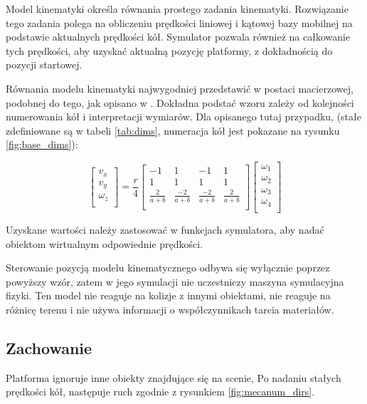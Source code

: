 	Model kinematyki określa równania prostego zadania kinematyki. 
	Rozwiązanie tego zadania polega na obliczeniu prędkości liniowej i kątowej bazy mobilnej na podstawie aktualnych prędkości kół.
	Symulator pozwala również na całkowanie tych prędkości, aby uzyskać aktualną pozycję platformy, z dokładnością do pozycji startowej.
	
	Równania modelu kinematyki najwygodniej przedstawić w postaci macierzowej, podobnej do tego, jak opisano w \cite{wheels}. 
	Dokładna podstać wzoru zależy od kolejności numerowania kół i interpretacji wymiarów.
	Dla opisanego tutaj przypadku, (stałe zdefiniowane są w tabeli \ref{tab:dims}, numeracja kół jest pokazane na rysunku \ref{fig:base_dims}):
	
	\begin{equation}
	\begin{bmatrix}
	v_x \\
	v_y \\
	\omega_z \\
	\end{bmatrix}
	=
	\frac{r}{4}
	\begin{bmatrix}
	-1 & 1 & -1 & 1 \\
	1 & 1 & 1 & 1 \\
	\frac{2}{a+b} & \frac{-2}{a+b} & \frac{-2}{a+b} & \frac{2}{a+b} \\
	\end{bmatrix}
	\begin{bmatrix}
	\omega_1 \\
	\omega_2 \\
	\omega_3 \\
	\omega_4 \\
	\end{bmatrix}
	\end{equation}
	
	Uzyskane wartości należy zastosować w funkcjach symulatora, aby nadać obiektom wirtualnym odpowiednie prędkości.
	
	Sterowanie pozycją modelu kinematycznego odbywa się wyłącznie poprzez powyższy wzór, zatem w jego symulacji nie uczestniczy maszyna symulacyjna fizyki.
	Ten model nie reaguje na kolizje z innymi obiektami, nie reaguje na różnicę terenu i nie używa informacji o współczynnikach tarcia materiałów.

	\subsection{Zachowanie}
		Platforma ignoruje inne obiekty znajdujące się na scenie,
		Po nadaniu stałych prędkości kół, następuje ruch zgodnie z rysunkiem \ref{fig:mecanum_dirs}.

